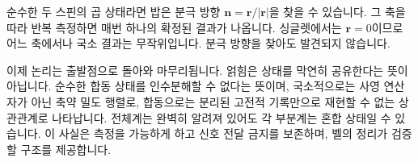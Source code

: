 순수한 두 스핀의 곱 상태라면 밥은 분극 방향 \(\mathbf n=\mathbf r/|\mathbf r|\)을 찾을 수 있습니다. 그 축을 따라 반복 측정하면 매번 하나의 확정된 결과가 나옵니다. 싱글렛에서는 \(\mathbf r=0\)이므로 어느 축에서나 국소 결과는 무작위입니다. 분극 방향을 찾아도 발견되지 않습니다.

\begin{classroomqa}
\end{classroomqa}

\begin{classroomqa}
\end{classroomqa}

이제 논리는 출발점으로 돌아와 마무리됩니다. 얽힘은 상태를 막연히 공유한다는 뜻이 아닙니다. 순수한 합동 상태를 인수분해할 수 없다는 뜻이며, 국소적으로는 사영 연산자가 아닌 축약 밀도 행렬로, 합동으로는 분리된 고전적 기록만으로 재현할 수 없는 상관관계로 나타납니다. 전체계는 완벽히 알려져 있어도 각 부분계는 혼합 상태일 수 있습니다. 이 사실은 측정을 가능하게 하고 신호 전달 금지를 보존하며, 벨의 정리가 검증할 구조를 제공합니다.
